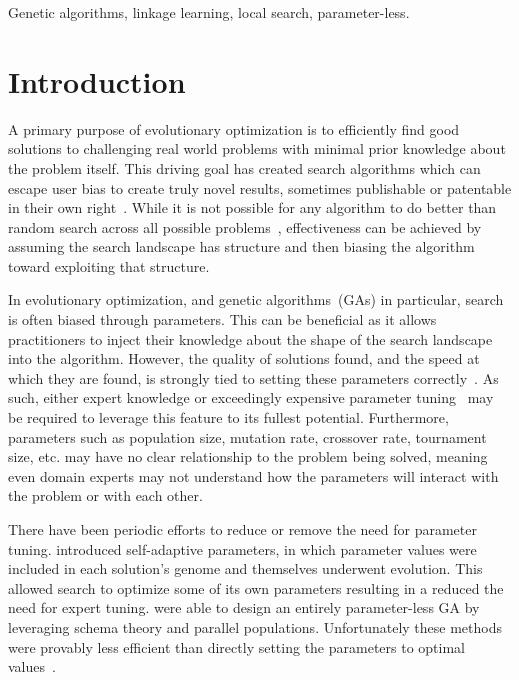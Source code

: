 \documentclass[twoside]{article}
\begin{document}
\begin{keywords}

Genetic algorithms, 
linkage learning,
local search,
parameter-less.

\end{keywords}

\section{Introduction}
A primary purpose of evolutionary optimization is to efficiently find good solutions
to challenging real world problems with minimal prior knowledge about the problem itself.
This driving goal has created search algorithms which can escape user bias to create
truly novel results, sometimes publishable or patentable in their own right~\citep{kannappan:2014:humies}.
While it is not possible for any algorithm to do better than random search across all possible
problems~\citep{Wolpert:1997:nfl}, effectiveness can be achieved by assuming the search
landscape has structure and then biasing the algorithm toward exploiting that structure.

In evolutionary optimization, and genetic algorithms~(GAs) in particular, search is often
biased through parameters. This can be beneficial as it allows practitioners to inject their
knowledge about the shape of the search landscape into the algorithm.
However, the quality of solutions found, and the speed at which they are found, is strongly tied to setting these parameters
correctly~\citep{goldberg:1991:gasize}. As such, either expert knowledge or exceedingly
expensive parameter tuning~\citep{grefenstette:1986:optimalga} may be required to leverage
this feature to its fullest potential. Furthermore,  parameters such as population size, mutation rate, crossover
rate, tournament size, etc. may have no clear relationship to the problem being solved, meaning even
domain experts may not understand how the parameters will interact with the problem or with each other.

There have been periodic efforts to reduce or remove the need for parameter tuning.
\cite{Back:1992:selfadapt} introduced self-adaptive parameters, in which parameter values
were included in each solution's genome and themselves underwent evolution. This allowed search
to optimize some of its own parameters resulting in a reduced the need for expert tuning.
\cite{harik:1999:parameterlessga} were able to design an entirely parameter-less GA by
leveraging schema theory and parallel populations. Unfortunately these methods were provably less efficient
than directly setting the parameters to optimal values~\citep{pelikan:1999:worstparameter-less}.
\end{document}
